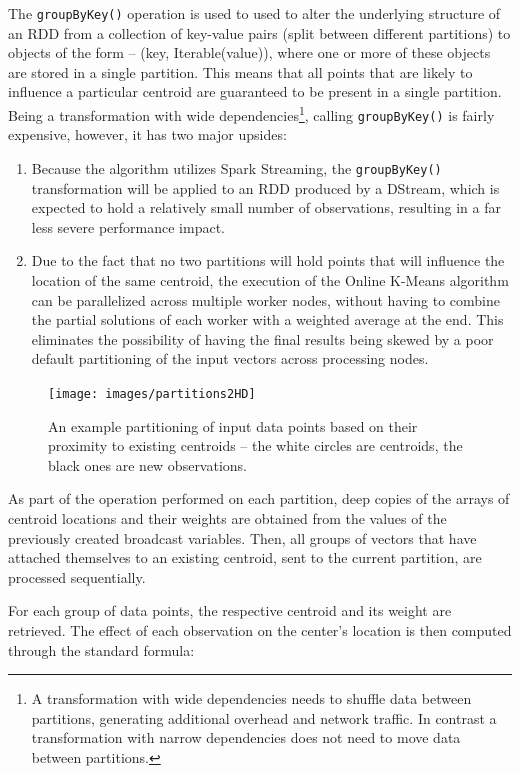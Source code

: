 \documentclass{l4proj}
\begin{document}
The \texttt{groupByKey()} operation is used to used to alter the underlying structure of an RDD from a collection of key-value pairs (split between different partitions) to objects of the form -- (key, Iterable(value)), where one or more of these objects are stored in a single partition. This means that all points that are likely to influence a particular centroid are guaranteed to be present in a single partition. Being a transformation with wide dependencies\footnote{A transformation with wide dependencies needs to shuffle data between partitions, generating additional overhead and network traffic. In contrast a transformation with narrow dependencies does not need to move data between partitions.}, calling \texttt{groupByKey()} is fairly expensive, however, it has two major upsides:

\begin{enumerate}
\item Because the algorithm utilizes Spark Streaming, the \texttt{groupByKey()} transformation will be applied to an RDD produced by a DStream, which is expected to hold a relatively small number of observations, resulting in a far less severe performance impact.
\item Due to the fact that no two partitions will hold points that will influence the location of the same centroid, the execution of the Online K-Means algorithm can be parallelized across multiple worker nodes, without having to combine the partial solutions of each worker with a weighted average at the end. This eliminates the possibility of having the final results being skewed by a poor default partitioning of the input vectors across processing nodes. 
\end{enumerate}

\begin{figure}[H]
	\centering
    \texttt{[image: images/partitions2HD]}
    \caption{An example partitioning of input data points based on their proximity to existing centroids -- the white circles are centroids, the black ones are new observations.} 
    \label{partitions2}
\end{figure}

As part of the operation performed on each partition, deep copies of the arrays of centroid locations and their weights are obtained from the values of the previously created broadcast variables. Then, all groups of vectors that have attached themselves to an existing centroid, sent to the current partition, are processed sequentially.

For each group of data points, the respective centroid and its weight are retrieved. The effect of each observation on the center's location is then computed through the standard formula:
\end{document}
